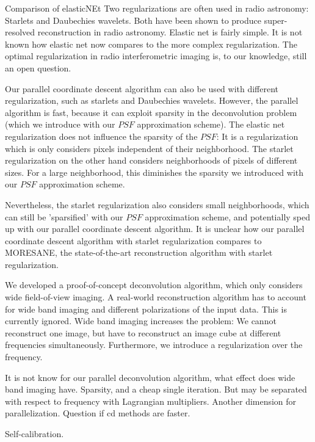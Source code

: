 Comparison of elasticNEt
Two regularizations are often used in radio astronomy: Starlets \cite{starck2015starlet} and Daubechies wavelets\cite{carrillo2014purify}. Both have been shown to produce super-resolved reconstruction in radio astronomy\cite{dabbech2015moresane, dabbech2018cygnus}. Elastic net is fairly simple. It is not known how elastic net now compares to the more complex regularization.
The optimal regularization in radio interferometric imaging is, to our knowledge, still an open question. 

Our parallel coordinate descent algorithm can also be used with different regularization, such as starlets and Daubechies wavelets. However, the parallel algorithm is fast, because it can exploit sparsity in the deconvolution problem (which we introduce with our $PSF$ approximation scheme). The elastic net regularization does not influence the sparsity of the $PSF$: It is a regularization which is only considers pixels independent of their neighborhood. The starlet regularization on the other hand considers neighborhoods of pixels of different sizes. For a large neighborhood, this diminishes the sparsity we introduced with our $PSF$ approximation scheme.  

Nevertheless, the starlet regularization also considers small neighborhoods, which can still be 'sparsified' with our $PSF$ approximation scheme, and potentially sped up with our parallel coordinate descent algorithm. It is unclear how our parallel coordinate descent algorithm with starlet regularization compares to MORESANE, the state-of-the-art reconstruction algorithm with starlet regularization.

We developed a proof-of-concept deconvolution algorithm, which only considers wide field-of-view imaging. A real-world reconstruction algorithm has to account for wide band imaging and different polarizations of the input data. This is currently ignored. Wide band imaging increases the problem: We cannot reconstruct one image, but have to reconstruct an image cube at different frequencies simultaneously. Furthermore, we introduce a regularization over the frequency.

It is not know for our parallel deconvolution algorithm, what effect does wide band imaging have. 
Sparsity, and a cheap single iteration.
But may be separated with respect to frequency with Lagrangian multipliers. Another dimension for parallelization. 
Question if cd methods are faster.

Self-calibration.

